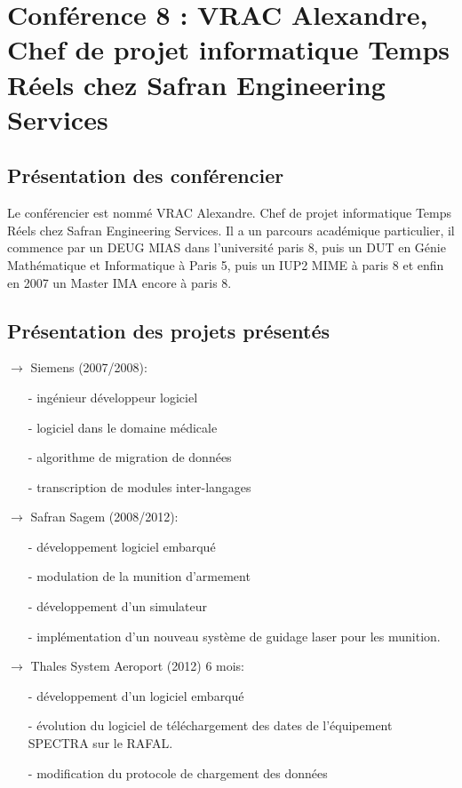 \section{Conférence 8 : VRAC Alexandre, Chef de projet informatique Temps Réels chez Safran Engineering Services}
	
 	\subsection{Présentation des conférencier}
		Le conférencier est  nommé VRAC Alexandre. Chef de projet informatique Temps Réels chez Safran Engineering Services. Il a un parcours académique particulier, il commence par un DEUG MIAS dans l'université paris 8, puis un DUT en Génie Mathématique et Informatique à Paris 5, puis un IUP2 MIME à paris 8 et enfin en 2007 un Master IMA encore à paris 8.

	\subsection{Présentation des projets présentés}
		$\rightarrow$ Siemens (2007/2008):
		\begin{itemize}
			\item[-] ingénieur développeur logiciel 
			\item[-] logiciel dans le domaine médicale 
			\item[-] algorithme de migration de données
			\item[-] transcription de modules inter-langages
		\end{itemize}

		$\rightarrow$ Safran Sagem (2008/2012):
		\begin{itemize}
			\item[-] développement logiciel embarqué  
			\item[-] modulation de la munition d'armement 
			\item[-] développement d'un simulateur 
			\item[-] implémentation d'un nouveau système de guidage laser pour les munition.
		\end{itemize}

		$\rightarrow$ Thales System Aeroport (2012) 6 mois:
		\begin{itemize}
			\item[-] développement d'un logiciel embarqué 
			\item[-] évolution du logiciel de téléchargement des dates de l'équipement SPECTRA sur le RAFAL. 
			\item[-] modification du protocole de chargement des données 
		\end{itemize}

